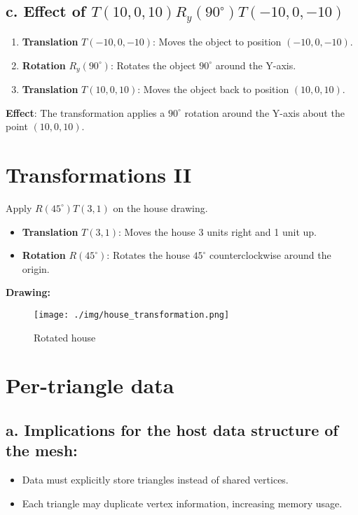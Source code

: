 \documentclass{article}
\begin{document}
\subsection{c. Effect of $T(10, 0, 10)R_y(90^\circ)T(-10, 0, -10)$}

\begin{enumerate}
    \item \textbf{Translation} $T(-10, 0, -10)$: Moves the object to position $(-10, 0, -10)$.
    \item \textbf{Rotation} $R_y(90^\circ)$: Rotates the object $90^\circ$ around the Y-axis.
    \item \textbf{Translation} $T(10, 0, 10)$: Moves the object back to position $(10, 0, 10)$.
\end{enumerate}
\textbf{Effect}: The transformation applies a $90^\circ$ rotation around the Y-axis about the point $(10, 0, 10)$.

\section{Transformations II}

Apply $R(45^\circ)T(3, 1)$ on the house drawing.
\begin{itemize}
    \item \textbf{Translation} $T(3, 1)$: Moves the house 3 units right and 1 unit up.
    \item \textbf{Rotation} $ R(45^\circ) $: Rotates the house $45^\circ$ counterclockwise around the origin.
\end{itemize}

\textbf{Drawing:}

\begin{figure}[H]
    \centering
    \texttt{[image: ./img/house\_transformation.png]}
    \caption{Rotated house}
    \label{fig:house}
\end{figure}

\section{Per-triangle data}

\subsection{a. Implications for the host data structure of the mesh:}
\begin{itemize}
    \item Data must explicitly store triangles instead of shared vertices.
    \item Each triangle may duplicate vertex information, increasing memory usage.
\end{itemize}
\end{document}
